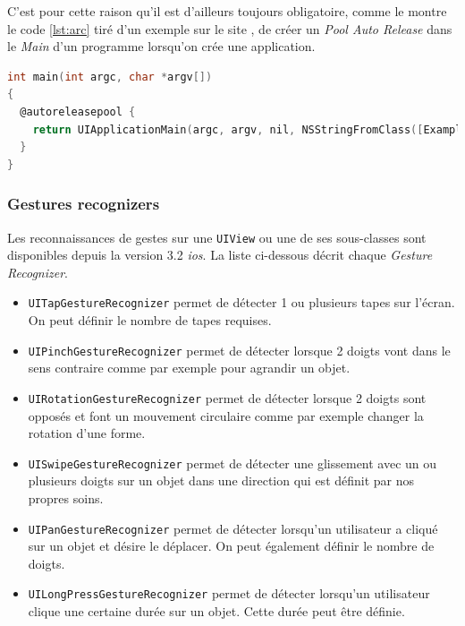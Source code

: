 \medskip

C'est pour cette raison qu'il est d'ailleurs toujours obligatoire, comme le montre le code \ref{lst:arc} tiré d'un exemple sur le site \cite{online:LongWeekendLLC}, de créer un \emph{Pool Auto Release} dans le \emph{Main} d'un programme lorsqu'on crée une application.
\begin{lstlisting}[language={C}, caption={Autorelease Pool tiré d'un exemple du site \cite{online:LongWeekendLLC}}, label={lst:arc}]
int main(int argc, char *argv[])
{
  @autoreleasepool {
    return UIApplicationMain(argc, argv, nil, NSStringFromClass([ExampleAppDelegate class]));
  }
}
\end{lstlisting}

\subsubsection{Gestures recognizers}

Les reconnaissances de gestes sur une \texttt{UIView} ou une de ses sous-classes sont disponibles depuis la version 3.2 \emph{\gls{ios}}. La liste ci-dessous décrit chaque \emph{Gesture Recognizer}.

\bigskip

\begin{itemize}
  \item \texttt{UITapGestureRecognizer} permet de détecter 1 ou plusieurs tapes sur l'écran. On peut définir le nombre de tapes requises.
  \item \texttt{UIPinchGestureRecognizer} permet de détecter lorsque 2 doigts vont dans le sens contraire comme par exemple pour agrandir un objet.
  \item \texttt{UIRotationGestureRecognizer} permet de détecter lorsque 2 doigts sont opposés et font un mouvement circulaire comme par exemple changer la rotation d'une forme.
  \item \texttt{UISwipeGestureRecognizer} permet de détecter une glissement avec un ou plusieurs doigts sur un objet dans une direction qui est définit par nos propres soins.
  \item \texttt{UIPanGestureRecognizer} permet de détecter lorsqu'un utilisateur a cliqué sur un objet et désire le déplacer. On peut également définir le nombre de doigts.
  \item \texttt{UILongPressGestureRecognizer} permet de détecter lorsqu'un utilisateur clique une certaine durée sur un objet. Cette durée peut être définie.
\end{itemize}

